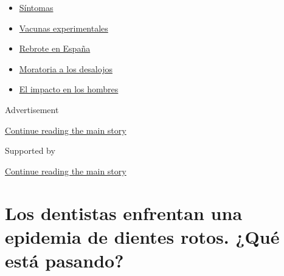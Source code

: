 \begin{itemize}
\tightlist
\item
  \href{https://www.nytimes3xbfgragh.onion/es/interactive/2020/08/06/espanol/ciencia-y-tecnologia/tengo-covid-19-sintomas.html?name=styln-coronavirus-es\&region=TOP_BANNER\&block=storyline_menu_recirc\&action=click\&pgtype=Article\&impression_id=36a4d0b1-f283-11ea-8f04-735a2495ff97\&variant=undefined}{Síntomas}
\item
  \href{https://www.nytimes3xbfgragh.onion/es/2020/09/02/espanol/ciencia-y-tecnologia/vacunas-experimentales-coronavirus.html?name=styln-coronavirus-es\&region=TOP_BANNER\&block=storyline_menu_recirc\&action=click\&pgtype=Article\&impression_id=36a4d0b2-f283-11ea-8f04-735a2495ff97\&variant=undefined}{Vacunas
  experimentales}
\item
  \href{https://www.nytimes3xbfgragh.onion/es/2020/08/31/espanol/mundo/rebrote-espana.html?name=styln-coronavirus-es\&region=TOP_BANNER\&block=storyline_menu_recirc\&action=click\&pgtype=Article\&impression_id=36a4d0b3-f283-11ea-8f04-735a2495ff97\&variant=undefined}{Rebrote
  en España}
\item
  \href{https://www.nytimes3xbfgragh.onion/es/2020/09/02/espanol/negocios/desalojos-trump.html?name=styln-coronavirus-es\&region=TOP_BANNER\&block=storyline_menu_recirc\&action=click\&pgtype=Article\&impression_id=36a4d0b4-f283-11ea-8f04-735a2495ff97\&variant=undefined}{Moratoria
  a los desalojos}
\item
  \href{https://www.nytimes3xbfgragh.onion/es/2020/08/26/espanol/ciencia-y-tecnologia/coronavirus-afecta-hombres.html?name=styln-coronavirus-es\&region=TOP_BANNER\&block=storyline_menu_recirc\&action=click\&pgtype=Article\&impression_id=36a4d0b5-f283-11ea-8f04-735a2495ff97\&variant=undefined}{El
  impacto en los hombres}
\end{itemize}

Advertisement

\protect\hyperlink{after-top}{Continue reading the main story}

Supported by

\protect\hyperlink{after-sponsor}{Continue reading the main story}

\hypertarget{los-dentistas-enfrentan-una-epidemia-de-dientes-rotos-quuxe9-estuxe1-pasando}{%
\section{Los dentistas enfrentan una epidemia de dientes rotos. ¿Qué
está
pasando?}\label{los-dentistas-enfrentan-una-epidemia-de-dientes-rotos-quuxe9-estuxe1-pasando}}

